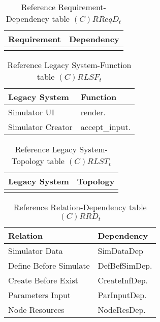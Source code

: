 \begin{table}[H]
	\centering
	\begin{tabular}{|p{4cm}|p{8cm}|}
			\hline
			\textbf{Requirement} & \textbf{Dependency} \\
			\hline
			 & \\
			\hline
		\end{tabular}
		\caption{Reference Requirement-Dependency table $(C)RReqD_t$}
	\label{tab:crreqdt}
\end{table}

\begin{table}[H]
	\centering
	\begin{tabular}{|p{4cm}|p{8cm}|}
			\hline
			\textbf{Legacy System} & \textbf{Function} \\
			\hline
			Simulator UI & render. \\
			\hline
			Simulator Creator & accept\_input. \\
			\hline
		\end{tabular}
	\caption{Reference Legacy System-Function table $(C)RLSF_t$}
	\label{tab:crlsft}
\end{table}

\begin{table}[H]
	\centering
	\begin{tabular}{|p{4cm}|p{8cm}|}
			\hline
			\textbf{Legacy System} & \textbf{Topology} \\
			\hline
			& \\
			\hline
		\end{tabular}
	\caption{Reference Legacy System-Topology table $(C)RLST_t$}
	\label{tab:crlsTt}
\end{table}

\begin{table}[H]
	\centering
	\begin{tabular}{|p{4cm}|p{8cm}|}
			\hline
			\textbf{Relation} & \textbf{Dependency} \\
			\hline
			Simulator Data & SimDataDep \\
			\hline
			Define Before Simulate & DefBefSimDep. \\
			\hline
			Create Before Exist & CreateInfDep. \\
			\hline
			Parameters Input & ParInputDep. \\
			\hline
			Node Resources & NodeResDep. \\
			\hline
		\end{tabular}
	\caption{Reference Relation-Dependency table $(C)RRD_t$}
	\label{tab:crrdt}
\end{table}

